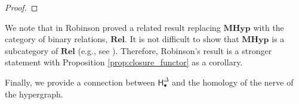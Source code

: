 \documentclass{amsart}
\newcommand{\Simp}{\mathrm{\textbf{Simp}}}
\newcommand{\Hyp}{\mathrm{\textbf{Hyp}}}
\newcommand{\MHyp}{\mathrm{\textbf{MHyp}}}
\newcommand{\Rel}{\mathrm{\textbf{Rel}}}
\newcommand{\Hgroup}	     {\mathsf{H}}
\renewcommand{\hom}[2]{\Hgroup_{#2}^{#1}}
\renewcommand{\H}{\mathcal{H}}
\newcommand{\po}{\mathcal{P}}
\newcommand{\cEP}[1]{{\textcolor{blue}{[Comment from Emilie: #1]}}}
\begin{document}
\begin{proof}
\end{proof}

We note that in \cite[Theorem 3]{robinson2022cosheaf} Robinson proved a related result replacing $\MHyp$ with the category of binary relations, $\Rel$. It is not difficult to show that $\MHyp$ is a subcategory of $\Rel$ (e.g., see \cite{green2025topological}). Therefore, Robinson's result is a stronger statement with Proposition \ref{prop:closure_functor} as a corollary.

Finally, we provide a connection between $\hom{\Delta}{\bullet}$ and the homology of the nerve of the hypergraph. 
\end{document}
